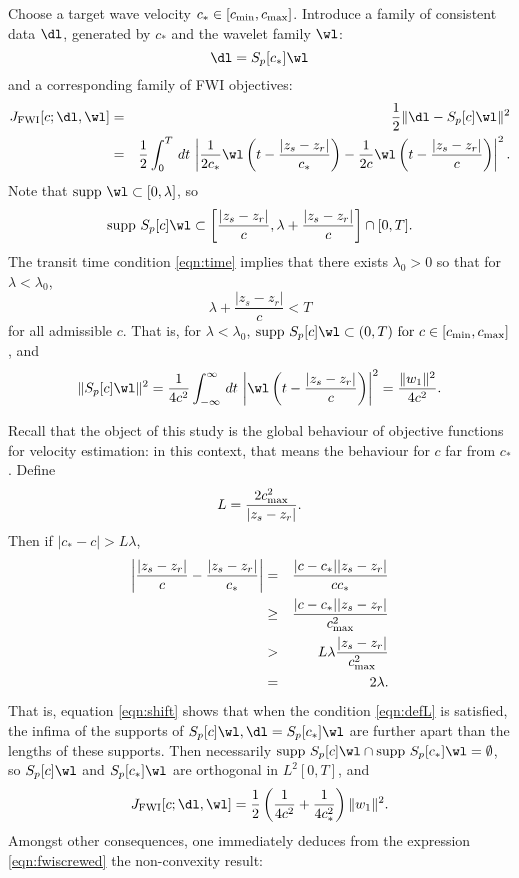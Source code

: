 Choose a target wave velocity $c_* \in [c_{\rm min},c_{\rm
  max}]$. Introduce a family of consistent data $\dl$, generated by
$c_*$ and the wavelet family $\wl$:
\begin{equation}
  \label{eqn:dfam}
  \dl = S_p[c_*]\wl
\end{equation}
and a corresponding family of FWI objectives:
\begin{eqnarray}
  J_{\rm FWI}[c;\dl,\wl] &=& \frac{1}{2}\|\dl-S_p[c]\wl\|^2\nonumber\\
  &=& \frac{1}{2} \int_0^T\,dt\,\left|\frac{1}{2c_*}\wl\left(t-\frac{|z_s-z_r|}{c_*}\right)
    - \frac{1}{2c}\wl\left(t-\frac{|z_s-z_r|}{c}\right)\right|^2.
  \label{eqn:fwiexpl}
\end{eqnarray}
Note that $\mbox{supp }\wl \subset [0,\lambda]$, so
\begin{equation}
  \label{eqn:wlsupps}
  \mbox{supp }S_p[c]\wl \subset \left[\frac{|z_s-z_r|}{c},\lambda
    +\frac{|z_s-z_r|}{c}\right] \cap [0,T].
\end{equation}
The transit time condition \ref{eqn:time} implies that there exists
$\lambda_0>0$ so that for $\lambda < \lambda_0$,
\[
  \lambda +\frac{|z_s-z_r|}{c} < T
\]
for all admissible $c$. That is, 
for $\lambda <\lambda_0$, $\mbox{supp }S_p[c]\wl \subset(0,T)\mbox{
  for }c \in [c_{\rm min},c_{\rm max}]$, and 
\begin{equation}
  \label{eqn:constnorm}
  \|S_p[c]\wl\|^2 = \frac{1}{4c^2}\int_{-\infty}^{\infty}\,dt\,\left|
    \wl\left(t-\frac{|z_s-z_r|}{c}\right)\right|^2 =
  \frac{\|w_1\|^2}{4c^2}.
\end{equation}

Recall that the object of this study is the global behaviour of
objective functions for velocity estimation: in this context, that
means the behaviour for $c$ far from $c_*$. Define
\begin{equation}
  \label{eqn:defL}
  L = \frac{2 c_{\rm max}^2}{|z_s-z_r|}.
\end{equation}
Then if $|c_*-c| > L\lambda$,
\begin{eqnarray}
  \left|\frac{|z_s-z_r|}{c}-\frac{|z_s-z_r|}{c_*}\right|
  &=&\frac{|c-c_*||z_s-z_r|}{cc_*} \nonumber\\
  &\ge& \frac{|c-c_*||z_s-z_r|}{c_{\rm max}^2}\nonumber\\
  &>& L\lambda\frac{|z_s-z_r|}{c_{\rm max}^2} \nonumber\\
  &=& 2\lambda.
      \label{eqn:shift}
\end{eqnarray}
That is, equation \ref{eqn:shift} shows that when the condition
\ref{eqn:defL} is satisfied, the infima of the supports of $S_p[c]\wl, \dl=S_p[c_*]\wl$
are further apart than the lengths of these supports. Then
necessarily
  $\mbox{supp }S_p[c]\wl \cap \mbox{supp }S_p[c_*]\wl = \emptyset$, so
$S_p[c]\wl$ and $S_p[c_*]\wl$ are orthogonal in $L^2[0,T]$,
and
\begin{equation}
  \label{eqn:fwiscrewed}
   J_{\rm FWI}[c;\dl,\wl]  =
  \frac{1}{2}\left(\frac{1}{4c^2}+\frac{1}{4c_*^2}\right)\|w_1\|^2.
\end{equation}
Amongst other consequences, one immediately deduces from the
expression \ref{eqn:fwiscrewed} the non-convexity result:

